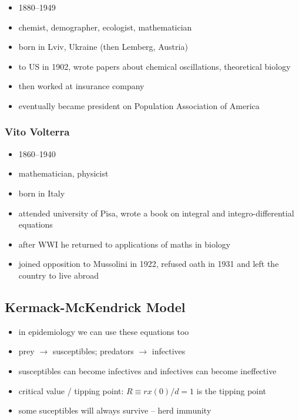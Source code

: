 \documentclass[a4paper,reqno,11pt]{article}
\begin{document}
\begin{itemize}
    \item 1880--1949
    \item chemist, demographer, ecologist, mathematician
    \item born in Lviv, Ukraine (then Lemberg, Austria)
    \item to US in 1902, wrote papers about chemical oscillations, theoretical
        biology
    \item then worked at insurance company
    \item eventually became president on Population Association of America
\end{itemize}

\subsubsection{Vito Volterra}

\begin{itemize}
    \item 1860--1940
    \item mathematician, physicist
    \item born in Italy
    \item attended university of Pisa, wrote a book on integral and
        integro-differential equations
    \item after WWI he returned to applications of maths in biology
    \item joined opposition to Mussolini in 1922, refused oath in 1931 and left
        the country to live abroad
\end{itemize}

\subsection{Kermack-McKendrick Model}

\begin{itemize}
    \item in epidemiology we can use these equations too
    \item prey $\rightarrow$ susceptibles; predators $\rightarrow$ infectives
    \item susceptibles can become infectives and infectives can become
        ineffective
    \item critical value / tipping point: $R \equiv rx(0)/d = 1$ is the tipping
        point
    \item some suceptibles will always survive -- herd immunity
\end{itemize}
\end{document}
